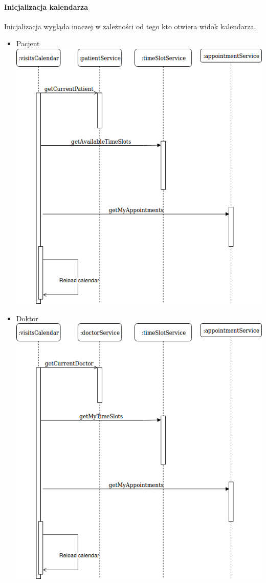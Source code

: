 \documentclass[polish,12pt]{aghthesis}
\begin{document}
\paragraph{Inicjalizacja kalendarza}
Inicjalizacja wygląda inaczej w zależności od tego kto otwiera widok kalendarza.
\begin{itemize}
    \item Pacjent \\
     \includegraphics[width=\textwidth]{patient-init-cal}
    \item Doktor \\
    \includegraphics[width=\textwidth]{doctor-init-cal}

\end{itemize}
\end{document}
